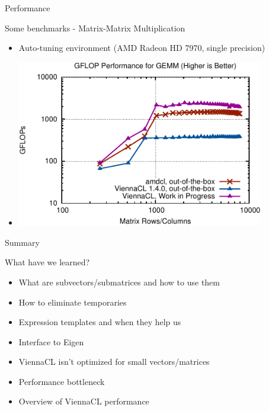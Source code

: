 \begin{frame}{Performance}
 \begin{block}{Some benchmarks - Matrix-Matrix Multiplication}
  \begin{itemize}
   \item Auto-tuning environment  (AMD Radeon HD 7970, single precision)
   \item \includegraphics[width=0.85\textwidth]{figs/gemm3.pdf}
  \end{itemize}
 \end{block}
\end{frame}





\begin{frame}{Summary}
\begin{block}{What have we learned?}
  \begin{itemize}
   \item What are subvectors/submatrices and how to use them
   \item How to eliminate temporaries
   \item Expression templates and when they help us
   \item Interface to Eigen
   \item ViennaCL isn't optimized for small vectors/matrices
   \item Performance bottleneck
   \item Overview of ViennaCL performance
  \end{itemize}
\end{block}
\end{frame}


















